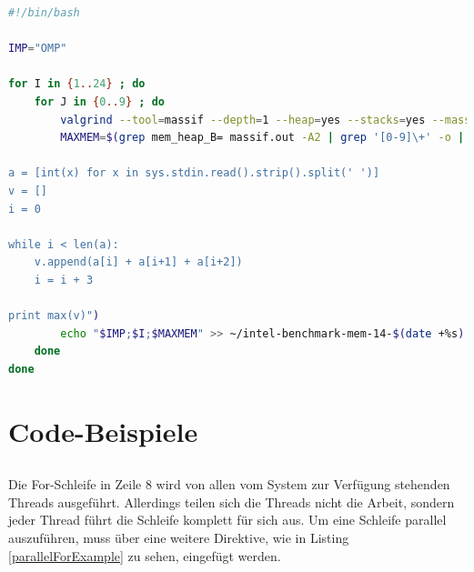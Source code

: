 \documentclass[11pt]{scrartcl}
\begin{document}
\begin{lstlisting}[language=Bash,caption=Bash-Skript zur Erfassung des Speicherverbrauchs]
#!/bin/bash

IMP="OMP"

for I in {1..24} ; do
	for J in {0..9} ; do
		valgrind --tool=massif --depth=1 --heap=yes --stacks=yes --massif-out-file=massif.out ../../run -nb_threads $I -from BOSTON -to MUNICH -departure_time_min 04102012000000 -departure_time_max 04142012000000 -arrival_time_min 05102012000000 -arrival_time_max 05142012000000 -max_layover 10000 -vacation_time_min 500000 -vacation_time_max 700000 -flights flights.txt -alliances alliances.txt -work_hard_file work_hard..txt -play_hard_file play_hard..txt -vacation_airports ATLANTA LONDON\ HEATHROW PHILADELPHIA RIO\ DE\ JANEIRO TORONTO
		MAXMEM=$(grep mem_heap_B= massif.out -A2 | grep '[0-9]\+' -o | tr "\n" " " | python -c "import sys

a = [int(x) for x in sys.stdin.read().strip().split(' ')]
v = []
i = 0

while i < len(a):
	v.append(a[i] + a[i+1] + a[i+2])
	i = i + 3

print max(v)")
		echo "$IMP;$I;$MAXMEM" >> ~/intel-benchmark-mem-14-$(date +%s).csv
	done
done
\end{lstlisting}

	

\pagebreak
\section{Code-Beispiele}

\subsection{}


Die For-Schleife in Zeile 8 wird von allen vom System zur Verfügung stehenden Threads ausgeführt. Allerdings teilen sich die Threads nicht die Arbeit, sondern jeder Thread führt die Schleife komplett für sich aus. Um eine Schleife parallel auszuführen, muss über eine weitere Direktive, wie in Listing \ref{parallelForExample} zu sehen, eingefügt werden. 
\end{document}
